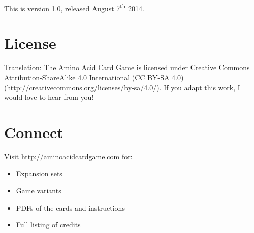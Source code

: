 \documentclass[a4paper,11pt,oneside]{memoir}
\begin{document}
This is version 1.0, released August 7\textsuperscript{th} 2014.  


\section*{License}

Translation: The Amino Acid Card Game is licensed under \cc Creative Commons Attribution-ShareAlike 4.0 International (CC BY-SA 4.0)
(http://creativecommons.org/licenses/by-sa/4.0/).
If you adapt this work, I would love to hear from you!


\section*{Connect}

Visit http://aminoacidcardgame.com for:

\begin{itemize}
    \item Expansion sets
    \item Game variants
    \item PDFs of the cards and instructions
    \item Full listing of credits
\end{itemize}
\end{document}
